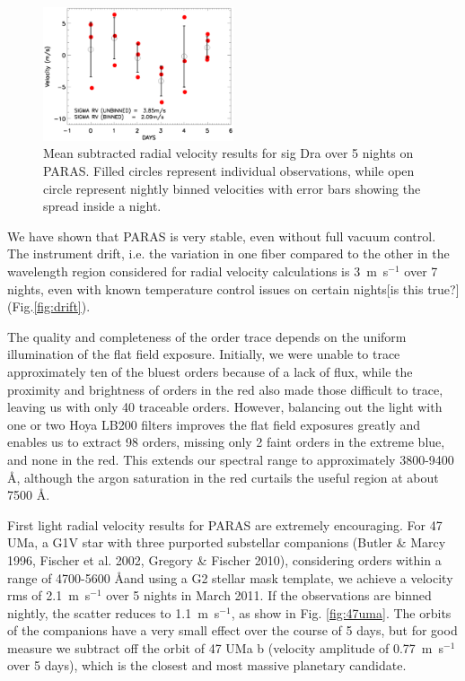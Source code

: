 \documentclass[12pt,preprint]{emulateapj}
\begin{document}
\begin{figure}[htbp] %
   \centering
   \includegraphics[width=0.5\textwidth]{sigdra_paper.eps} 
    \caption{Mean subtracted radial velocity results for sig Dra over 5 nights on PARAS. Filled circles represent individual observations, while open circle represent nightly binned velocities with error bars showing the spread inside a night. }
   \label{fig:sigdra}
\end{figure}

We have shown that PARAS is very stable, even without full vacuum control. The instrument drift, i.e. the variation in one fiber compared to the other in the wavelength region considered for radial velocity calculations is 3~m~s$^{-1}$ over 7 nights, even with known temperature control issues on certain nights[is this true?] (Fig.\ref{fig:drift}).

The quality and completeness of the order trace depends on the uniform illumination of the flat field exposure. Initially, we were unable to trace approximately ten of the bluest orders because of a lack of flux, while the proximity and brightness of orders in the red also made those difficult to trace, leaving us with only 40 traceable orders. However, balancing out the light with one or two Hoya LB200 filters improves the flat field exposures greatly and enables us to extract 98 orders, missing only 2 faint orders in the extreme blue, and none in the red. This extends our spectral range to approximately 3800-9400 \AA, although the argon saturation in the red curtails the useful region at about 7500 \AA. 

First light radial velocity results for PARAS are extremely encouraging. For 47 UMa, a G1V star with three purported substellar companions (Butler \& Marcy 1996, Fischer et al. 2002, Gregory \& Fischer 2010), considering orders within a range of 4700-5600 \AA and using a G2 stellar mask template, we achieve a velocity rms of 2.1~m~s$^{-1}$ over 5 nights in March 2011. If the observations are binned nightly, the scatter reduces to 1.1~m~s$^{-1}$, as show in Fig. \ref{fig:47uma}. The orbits of the companions have a very small effect over the course of 5 days, but for good measure we subtract off the orbit of 47 UMa b (velocity amplitude of 0.77~m~s$^{-1}$ over 5 days), which is the closest and most massive planetary candidate. 
\end{document}

